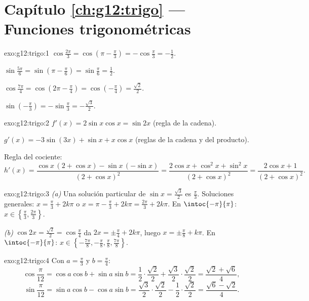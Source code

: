 \section*{Capítulo \ref{ch:g12:trigo} --- Funciones trigonométricas}

\begin{solution}{exo:g12:trigo:1}
$\cos\frac{2\pi}{3} = \cos\left(\pi - \frac\pi3\right) = -\cos\frac\pi3
= -\frac12$.

$\sin\frac{5\pi}{6} = \sin\left(\pi - \frac\pi6\right) = \sin\frac\pi6
= \frac12$.

$\cos\frac{7\pi}{4} = \cos\left(2\pi - \frac{\pi}{4}\right)
= \cos\left(-\frac\pi4\right) = \frac{\sqrt2}{2}$.

$\sin\left(-\frac\pi3\right) = -\sin\frac\pi3 = -\frac{\sqrt3}{2}$.
\end{solution}

\begin{solution}{exo:g12:trigo:2}
$f'(x) = 2\sin x\cos x = \sin 2x$ (regla de la cadena).

$g'(x) = -3\sin(3x) + \sin x + x\cos x$ (reglas de la cadena y del
producto).

Regla del cociente:
\[
h'(x) = \frac{\cos x\,(2 + \cos x) - \sin x\,(-\sin x)}{(2+\cos x)^2}
= \frac{2\cos x + \cos^2 x + \sin^2 x}{(2+\cos x)^2}
= \frac{2\cos x + 1}{(2+\cos x)^2}.
\]
\end{solution}

\begin{solution}{exo:g12:trigo:3}
\emph{(a)} Una solución particular de $\sin x = \frac{\sqrt3}{2}$ es
$\frac\pi3$. Soluciones generales: $x = \frac\pi3 + 2k\pi$ o
$x = \pi - \frac\pi3 + 2k\pi = \frac{2\pi}{3} + 2k\pi$. En
$\intoc{-\pi}{\pi}$: $x \in \left\{\frac\pi3, \frac{2\pi}{3}\right\}$.

\emph{(b)} $\cos 2x = \frac{\sqrt2}{2} = \cos\frac\pi4$ da
$2x = \pm\frac\pi4 + 2k\pi$, luego $x = \pm\frac\pi8 + k\pi$. En
$\intoc{-\pi}{\pi}$:
$x \in \left\{-\frac{7\pi}{8}, -\frac\pi8, \frac\pi8, \frac{7\pi}{8}\right\}$.
\end{solution}

\begin{solution}{exo:g12:trigo:4}
Con $a = \frac\pi3$ y $b = \frac\pi4$:
\[
\cos\frac{\pi}{12} = \cos a\cos b + \sin a \sin b
= \frac12\cdot\frac{\sqrt2}{2} + \frac{\sqrt3}{2}\cdot\frac{\sqrt2}{2}
= \frac{\sqrt2 + \sqrt6}{4},
\]
\[
\sin\frac{\pi}{12} = \sin a\cos b - \cos a \sin b
= \frac{\sqrt3}{2}\cdot\frac{\sqrt2}{2} - \frac12\cdot\frac{\sqrt2}{2}
= \frac{\sqrt6 - \sqrt2}{4}.
\]
\end{solution}

